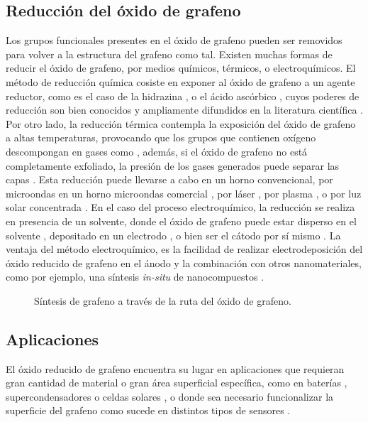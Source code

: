 \subsection{Reducción del óxido de grafeno}
Los grupos funcionales presentes en el óxido de grafeno pueden ser removidos para volver a la estructura del grafeno como tal.
Existen muchas formas de reducir el óxido de grafeno, por medios químicos, térmicos, o electroquímicos. El método de reducción química cosiste en exponer al óxido de grafeno a un agente reductor, como es el caso de la hidrazina , o el ácido ascórbico \citep{Fernandez-Merino2010}, cuyos poderes de reducción son bien conocidos y ampliamente difundidos en la literatura científica \citep{Chua2015}. Por otro lado, la reducción térmica contempla la exposición del óxido de grafeno a altas temperaturas, provocando que los grupos que contienen oxígeno descompongan en gases como , además, si el óxido de grafeno no está completamente exfoliado, la presión de los gases generados puede separar las capas \citep{Pei2012}. Esta reducción puede llevarse a cabo en un horno convencional, por microondas en un horno microondas comercial \citep{Zhu2010a}, por láser \citep{El-Kady2013}, por plasma \citep{Lee2012}, o por luz solar concentrada \citep{Mohandoss2017}. En el caso del proceso electroquímico, la reducción se realiza en presencia de un solvente, donde el óxido de grafeno puede estar disperso en el solvente \citep{Liu2011}, depositado en un electrodo \citep{Harima2011, Toh2014}, o bien ser el cátodo por sí mismo \citep{Feng2016}. La ventaja del método electroquímico, es la facilidad de realizar electrodeposición del óxido reducido de grafeno en el ánodo y la combinación con otros nanomateriales, como por ejemplo, una síntesis \emph{in-situ} de nanocompuestos \citep{Liu2011, Xie2014}.


\begin{figure}
	\centering
	\caption[Síntesis de grafeno a través de la ruta del óxido de grafeno]{Síntesis de grafeno a través de la ruta del óxido de grafeno.}
	\label{fig:graphiteToRGO}
\end{figure}



\subsection{Aplicaciones}
El óxido reducido de grafeno encuentra su lugar en aplicaciones que requieran gran cantidad de material o gran área superficial específica, como en baterías \citep{Li2014}, supercondensadores \citep{Stoller2008} o celdas solares \citep{Roy-mayhew2014}, o donde sea necesario funcionalizar la superficie del grafeno como sucede en distintos tipos de sensores \citep{Schedin2007, Haick2013}.

